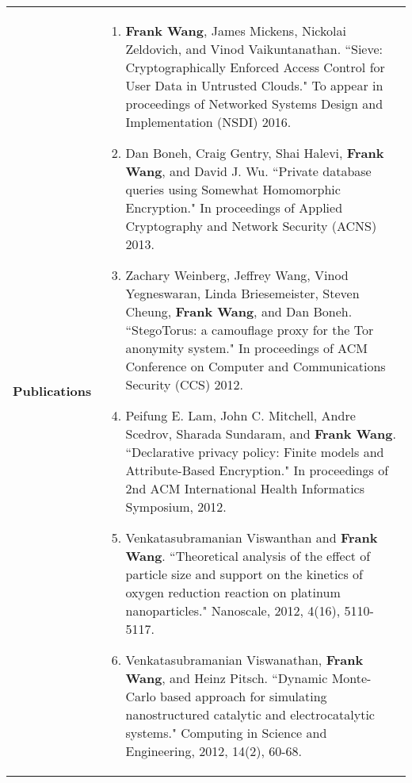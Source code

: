 \documentclass[a4paper,10pt]{article}
\begin{document}
\begin{longtable}{ p{0.9in} l }
\textbf{Publications} & \begin{minipage}[t]{0.78 \textwidth} 
\begin{enumerate}[leftmargin=*]
\setlength{\itemsep}{7pt}
                \setlength{\parskip}{0pt}
                \setlength{\parsep}{0pt}

\item{\textbf{Frank Wang}, James Mickens, Nickolai Zeldovich, and  Vinod Vaikuntanathan. ``Sieve: Cryptographically Enforced Access Control for User Data in Untrusted Clouds." To appear in proceedings of Networked Systems Design and Implementation (NSDI) 2016.}
               
\item{Dan Boneh, Craig Gentry, Shai Halevi, \textbf{Frank Wang}, and David J. Wu. ``Private database queries using Somewhat Homomorphic Encryption." In proceedings of Applied Cryptography and Network Security (ACNS) 2013.}

\item{Zachary Weinberg, Jeffrey Wang, Vinod Yegneswaran, Linda Briesemeister, Steven Cheung, \textbf{Frank Wang}, and Dan Boneh. ``StegoTorus: a camouflage proxy for the Tor anonymity system." In proceedings of ACM Conference on Computer and Communications Security (CCS) 2012.}

\item{Peifung E. Lam, John C. Mitchell, Andre Scedrov, Sharada Sundaram, and \textbf{Frank Wang}. ``Declarative privacy policy: Finite models and Attribute-Based Encryption." In proceedings of 2nd ACM International Health Informatics Symposium, 2012.}

\item{Venkatasubramanian Viswanthan and \textbf{Frank Wang}. ``Theoretical analysis of the effect of particle size and support on the kinetics of oxygen reduction reaction on platinum nanoparticles." Nanoscale, 2012, 4(16), 5110-5117.}

\item{Venkatasubramanian Viswanathan, \textbf{Frank Wang}, and Heinz Pitsch. ``Dynamic Monte-Carlo based approach for simulating nanostructured catalytic and electrocatalytic systems." Computing in Science and Engineering, 2012, 14(2), 60-68.}

\end{enumerate}
\end{minipage} \tabularnewline

\end{longtable} 
\end{document}
